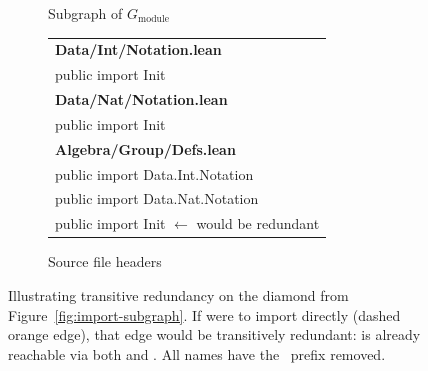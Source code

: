 \begin{figure}[H]
\centering
\begin{subfigure}[t]{0.42\textwidth}
\centering
\vspace{0pt}
\caption{Subgraph of $G_{\mathrm{module}}$}
\label{fig:tr-graph-app}
\end{subfigure}%
\hfill
\begin{subfigure}[t]{0.46\textwidth}
\vspace{0pt}\raggedleft
\scriptsize\ttfamily
\begin{tabular}[t]{@{}l@{}}
  \textnormal{\sffamily\bfseries\color{blue!60!black} Data/Int/Notation.lean} \\[1pt]
  \hspace{1em}public import \textcolor{blue!60!black}{Init} \\[6pt]
  \textnormal{\sffamily\bfseries\color{blue!60!black} Data/Nat/Notation.lean} \\[1pt]
  \hspace{1em}public import \textcolor{blue!60!black}{Init} \\[6pt]
  \textnormal{\sffamily\bfseries\color{blue!60!black} Algebra/Group/Defs.lean} \\[1pt]
  \hspace{1em}public import \textcolor{blue!60!black}{Data.Int.Notation} \\
  \hspace{1em}public import \textcolor{blue!60!black}{Data.Nat.Notation} \\
  \hspace{1em}\textcolor{orange!80!red}{public import \textcolor{blue!60!black}{Init}}
    \textnormal{\sffamily\color{orange!80!red} $\leftarrow$ would be redundant} \\
\end{tabular}
\caption{Source file headers}
\label{fig:tr-source-app}
\end{subfigure}
\caption{Illustrating transitive redundancy on the diamond from Figure~\ref{fig:import-subgraph}. If  were to import  directly (\textcolor{orange!80!red}{dashed orange} edge), that edge would be transitively redundant:  is already reachable via both  and . All names have the \ prefix removed.}
\label{fig:transitive-reduction-app}
\end{figure}
